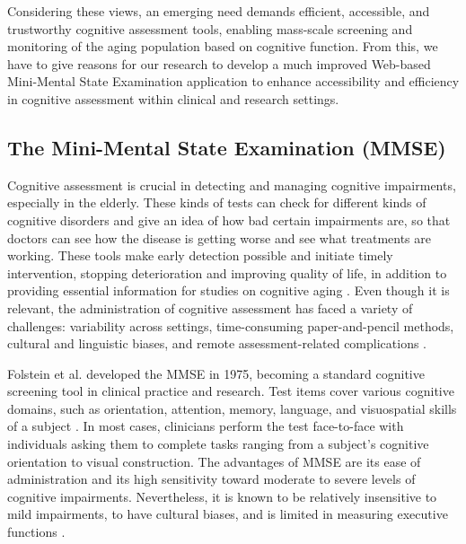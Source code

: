 Considering these views, an emerging need demands efficient, accessible, and trustworthy cognitive assessment tools, enabling mass-scale screening and monitoring of the aging population based on cognitive function. From this, we have to give reasons for our research to develop a much improved Web-based Mini-Mental State Examination application to enhance accessibility and efficiency in cognitive assessment within clinical and research settings.

\subsection{ The Mini-Mental State Examination (MMSE)}

Cognitive assessment is crucial in detecting and managing cognitive impairments, especially in the elderly. These kinds of tests can check for different kinds of cognitive disorders and give an idea of how bad certain impairments are, so that doctors can see how the disease is getting worse and see what treatments are working. These tools make early detection possible and initiate timely intervention, stopping deterioration and improving quality of life, in addition to providing essential information for studies on cognitive aging \cite{Langa2015, Petersen2018, Weintraub2009}. Even though it is relevant, the administration of cognitive assessment has faced a variety of challenges: variability across settings, time-consuming paper-and-pencil methods, cultural and linguistic biases, and remote assessment-related complications \cite{Prince2013, Cordell2013, Henrich2010, Goldberg2015, Geddes2020, Bilder2020}.

Folstein et al. \cite{Folstein1975} developed the MMSE in 1975, becoming a standard cognitive screening tool in clinical practice and research. Test items cover various cognitive domains, such as orientation, attention, memory, language, and visuospatial skills of a subject \cite{Folstein1975, Tombaugh1992, Shulman2006}. In most cases, clinicians perform the test face-to-face with individuals asking them to complete tasks ranging from a subject's cognitive orientation to visual construction. The advantages of MMSE are its ease of administration and its high sensitivity toward moderate to severe levels of cognitive impairments. Nevertheless, it is known to be relatively insensitive to mild impairments, to have cultural biases, and is limited in measuring executive functions \cite{Folstein1975}.

